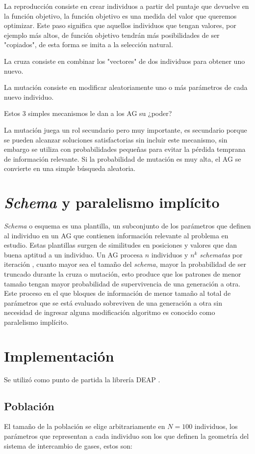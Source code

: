 La reproducción consiste en crear individuos a partir del puntaje que devuelve
en la función objetivo, la función objetivo es una medida del valor que
queremos optimizar.
%
Este paso significa que aquellos individuos que tengan valores, por ejemplo más
altos, de función objetivo tendrán más posibilidades de ser "copiados", de esta
forma se imita a la selección natural.

La cruza consiste en combinar los "vectores" de dos individuos para obtener uno
nuevo.

La mutación consiste en modificar aleatoriamente uno o más parámetros de cada
nuevo individuo.

Estos 3 simples mecanismos le dan a los AG su ¿poder?

La mutación juega un rol secundario pero muy importante, es secundario porque
se pueden alcanzar soluciones satisfactorias sin incluir este mecanismo, sin
embargo se utiliza con probabilidades pequeñas para evitar la pérdida temprana
de información relevante.
%
Si la probabilidad de mutación es muy alta, el AG se convierte en una simple
búsqueda aleatoria.

\section{\emph{Schema} y paralelismo implícito}

\emph{Schema} o esquema es una plantilla, un subconjunto de los parámetros que
definen al individuo en un AG que contienen información relevante al problema
en estudio.
%
Estas plantillas surgen de similitudes en posiciones y valores que dan buena
aptitud a un individuo.
%
Un AG procesa $n$ individuos y $n^k$ \emph{schematas} por iteración
\cite{goldberg}, cuanto mayor sea el tamaño del \emph{schema}, mayor la
probabilidad de ser truncado durante la cruza o mutación, esto produce que los
patrones de menor tamaño tengan mayor probabilidad de supervivencia de una
generación a otra.
%
Este proceso en el que bloques de información de menor tamaño al total de
parámetros que se está evaluado sobreviven de una generación a otra sin
necesidad de ingresar alguna modificación algoritmo es conocido como paralelismo
implícito.

\section{Implementación}
%
Se utilizó como punto de partida la librería DEAP \cite{DEAP_JMLR2012}.

\subsection{Población}
%
El tamaño de la población se elige arbitrariamente en $N=100$ individuos, los
parámetros que representan a cada individuo son los que definen la geometría
del sistema de intercambio de gases, estos son:

